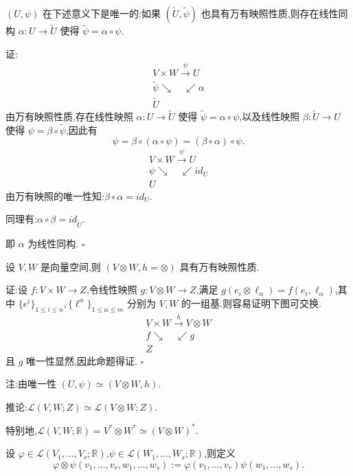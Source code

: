\begin{lemma}
$(U,\psi)$ 在下述意义下是唯一的:如果 $(\tilde{U},\tilde{\psi})$ 也具有万有映照性质,则存在线性同构 $\alpha: U \rightarrow \tilde{U}$ 使得 $\tilde{\psi} = \alpha \circ \psi$.
\end{lemma}

证:
\[
\begin{array}{c}
V \times W \xrightarrow{\psi} U \\
\tilde{\psi} \searrow \quad \swarrow \alpha \\
\tilde{U}
\end{array}
\]
由万有映照性质,存在线性映照 $\alpha: U \rightarrow \tilde{U}$ 使得 $\tilde{\psi} = \alpha \circ \psi$,以及线性映照 $\beta: \tilde{U} \rightarrow U$ 使得 $\psi = \beta \circ \tilde{\psi}$,因此有
\[
\psi = \beta \circ (\alpha \circ \psi) = (\beta \circ \alpha) \circ \psi.
\]
\[
\begin{array}{c}
V \times W \xrightarrow{\psi} U \\
\psi \searrow \quad \swarrow id_U \\
U
\end{array}
\]
由万有映照的唯一性知:$\beta \circ \alpha = id_U$.

同理有:$\alpha \circ \beta = id_{\tilde{U}}$.

即 $\alpha$ 为线性同构. $\square$

\begin{proposition}
设 $V, W$ 是向量空间,则 $(V \otimes W, h = \otimes)$ 具有万有映照性质.
\end{proposition}

证:设 $f: V \times W \rightarrow Z$,令线性映照 $g: V \otimes W \rightarrow Z$,满足 $g(e_i \otimes \ell_{\alpha}) = f(e_i, \ell_{\alpha})$,其中 $\{e^i\}_{1 \leq i \leq n}, \{\ell^{\alpha}\}_{1 \leq \alpha \leq m}$ 分别为 $V, W$ 的一组基.则容易证明下图可交换.
\[
\begin{array}{c}
V \times W \xrightarrow{h} V \otimes W \\
f \searrow \quad \swarrow g \\
Z
\end{array}
\]
且 $g$ 唯一性显然,因此命题得证. $\square$

注:由唯一性 $(U, \psi) \simeq (V \otimes W, h)$.

推论:$\mathcal{L}(V, W; Z) \simeq \mathcal{L}(V \otimes W; Z)$.

特别地,$\mathcal{L}(V, W; \mathbb{R}) = V^* \otimes W^* \simeq (V \otimes W)^*$.

设 $\varphi \in \mathcal{L}(V_1, \ldots, V_r; \mathbb{R})$,$\psi \in \mathcal{L}(W_1, \ldots, W_s; \mathbb{R})$,则定义
\[
\varphi \otimes \psi(v_1, \ldots, v_r, w_1, \ldots, w_s) := \varphi(v_1, \ldots, v_r) \psi(w_1, \ldots, w_s).
\]

